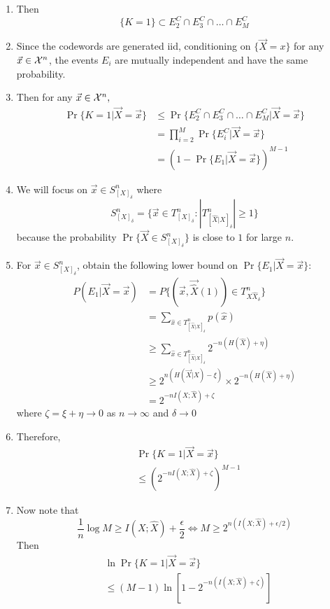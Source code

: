 \documentclass[../main.tex]{subfiles}
\begin{document}
\begin{enumerate}
    \item Then \[\{K=1\}\subset E_2^C\cap E_3^C\cap \dots \cap E_M^C
    \]
    \item Since the codewords are generated iid, conditioning on $\{\vec X=x\}$ for any $\vec x\in \mathcal{X}^n$, the events $E_i$ are mutually independent and have the same probability.
    \item Then for any $\vec x\in \mathcal{X}^n,$
    \begin{align*}
    \Pr\{K=1|\vec X=\vec x\} &\leq \Pr\{E_2^C\cap E_3^C\cap \dots \cap E_M^C|\vec X=\vec x\}\\
    &= \prod_{i=2}^M \Pr\{E_i^C|\vec X=\vec x\}\\
    &=(1-\Pr\{E_1|\vec X=\vec x\})^{M-1}
   \end{align*}
   \item We will focus on $\vec x \in S^n_{[X]_\delta}$ where \[
   S^n_{[X]_\delta} = \{\vec x\in T^n_{[X]_\delta}:|T^n_{[\hat X|X]_\delta}|\geq 1\}
   \] because the probability $\Pr\{\vec X\in S^n_{[X]_\delta}\}$ is close to $1$ for large $n$.
   \item For $\vec x\in S^n_{[X]_\delta}$, obtain the following lower bound on $\Pr\{E_1|\vec X=\vec x\}$:\begin{align*}
       P(E_1|\vec X=\vec x) &= P\{(\vec x, \vec{\hat X}(1)) \in T^n_{X\hat X_\delta}\}\\
       &= \sum_{\hat x\in T^n_{[\hat X|X]_\delta}}p(\hat x)\\
       &\geq \sum_{\hat x\in T^n_{[\hat X|X]_\delta}} 2^{-n(H(\hat X)+\eta)}\\
       &\geq 2^{n(H(\vec X|X)-\xi)} \times 2^{-n(H(\hat X)+\eta)}\\
       &= 2^{-nI(X;\hat X)+\zeta}
   \end{align*} where $\zeta = \xi + \eta \to 0$ as $n\to \infty$ and $\delta \to 0$
   \item Therefore, 
   \begin{align*}
       &\Pr\{K=1|\vec X=\vec x\} \\
       &\leq (2^{-nI(X;\hat X)+\zeta})^{M-1}
   \end{align*}
   \item Now note that \[
   \frac{1}{n}\log M\geq I(X;\hat X)+\frac{\epsilon}{2}\iff M\geq 2^{n(I(X;\hat X)+\epsilon/2)}
   \]
   Then \begin{align*}
       &\ln \Pr\{K=1|\vec X=\vec x\}\\
       &\leq (M-1)\ln [1-2^{-n(I(X;\hat X)+\zeta)}]\\

\end{align*}
\end{enumerate}
\end{document}
